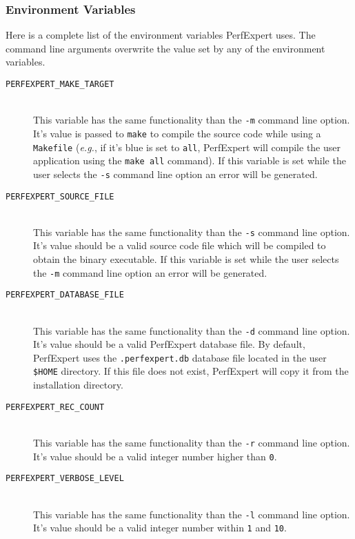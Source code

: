 \subsubsection{Environment Variables}

Here is a complete list of the environment variables PerfExpert uses. The command line arguments overwrite the value set by any of the environment variables.

\begin{description}
	\item[\texttt{PERFEXPERT\_MAKE\_TARGET}]\hfill \\
	This variable has the same functionality than the \texttt{-m} command line option. It's value is passed to \texttt{make} to compile the source code while using a \texttt{Makefile} (\textit{e.g.}, if it's blue is set to \texttt{all}, PerfExpert will compile the user application using the \texttt{make all} command). If this variable is set while the user selects the \texttt{-s} command line option an error will be generated.

	\item[\texttt{PERFEXPERT\_SOURCE\_FILE}]\hfill \\
	This variable has the same functionality than the \texttt{-s} command line option. It's value should be a valid source code file which will be compiled to obtain the binary executable. If this variable is set while the user selects the \texttt{-m} command line option an error will be generated.

	\item[\texttt{PERFEXPERT\_DATABASE\_FILE}]\hfill \\
	This variable has the same functionality than the \texttt{-d} command line option. It's value should be a valid PerfExpert database file. By default, PerfExpert uses the \texttt{.perfexpert.db} database file located in the user \texttt{\$HOME} directory. If this file does not exist, PerfExpert will copy it from the installation directory.

	\item[\texttt{PERFEXPERT\_REC\_COUNT}]\hfill \\
	This variable has the same functionality than the \texttt{-r} command line option. It's value should be a valid integer number higher than \texttt{0}.

	\item[\texttt{PERFEXPERT\_VERBOSE\_LEVEL}]\hfill \\
	This variable has the same functionality than the \texttt{-l} command line option. It's value should be a valid integer number within \texttt{1} and \texttt{10}.


\end{description}

